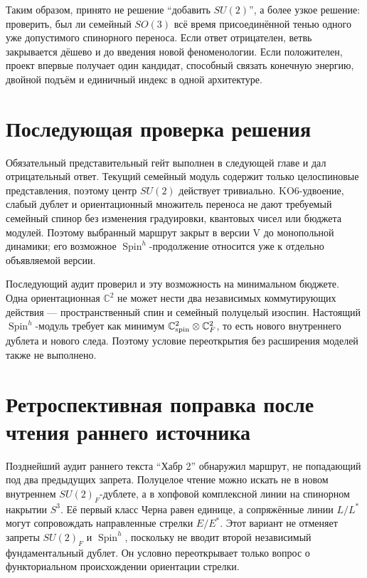 Таким образом, принято не решение ``добавить $SU(2)$'', а более узкое
решение: проверить, был ли семейный $SO(3)$ всё время присоединённой тенью
одного уже допустимого спинорного переноса. Если ответ отрицателен, ветвь
закрывается дёшево и до введения новой феноменологии. Если положителен,
проект впервые получает один кандидат, способный связать конечную энергию,
двойной подъём и единичный индекс в одной архитектуре.

\section{Последующая проверка решения}

Обязательный представительный гейт выполнен в следующей главе и дал
отрицательный ответ. Текущий семейный модуль содержит только целоспиновые
представления, поэтому центр $SU(2)$ действует тривиально. KO6-удвоение,
слабый дублет и ориентационный множитель переноса не дают требуемый
семейный спинор без изменения градуировки, квантовых чисел или бюджета
модулей. Поэтому выбранный маршрут закрыт в версии V до монопольной
динамики; его возможное $\operatorname{Spin}^h$-продолжение относится уже
к отдельно объявляемой версии.

Последующий аудит проверил и эту возможность на минимальном бюджете.
Одна ориентационная $\mathbb C^2$ не может нести два независимых
коммутирующих действия --- пространственный спин и семейный полуцелый
изоспин. Настоящий $\operatorname{Spin}^h$-модуль требует как минимум
$\mathbb C^2_{\rm spin}\otimes\mathbb C^2_F$, то есть нового внутреннего
дублета и нового следа. Поэтому условие переоткрытия без расширения
моделей также не выполнено.

\section{Ретроспективная поправка после чтения раннего источника}

Позднейший аудит раннего текста ``Хабр 2'' обнаружил маршрут, не
попадающий под два предыдущих запрета. Полуцелое чтение можно искать не в
новом внутреннем $SU(2)_F$-дублете, а в хопфовой комплексной линии на
спинорном накрытии $S^3$. Её первый класс Черна равен единице, а
сопряжённые линии $L/L^*$ могут сопровождать направленные стрелки
$E/E^*$. Этот вариант не отменяет запреты $SU(2)_F$ и
$\operatorname{Spin}^h$, поскольку не вводит второй независимый
фундаментальный дублет. Он условно переоткрывает только вопрос о
функториальном происхождении ориентации стрелки.


